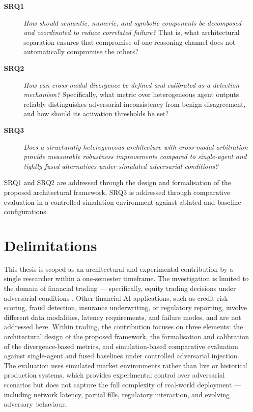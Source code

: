 \begin{description}
  \item[\textbf{SRQ1}] \emph{How should semantic, numeric, and symbolic
    components be decomposed and coordinated to reduce correlated failure?}
    That is, what architectural separation ensures that compromise of one
    reasoning channel does not automatically compromise the others?

  \item[\textbf{SRQ2}] \emph{How can cross-modal divergence be defined and
    calibrated as a detection mechanism?} Specifically, what metric over
    heterogeneous agent outputs reliably distinguishes adversarial
    inconsistency from benign disagreement, and how should its activation
    thresholds be set?

  \item[\textbf{SRQ3}] \emph{Does a structurally heterogeneous architecture
    with cross-modal arbitration provide measurable robustness improvements
    compared to single-agent and tightly fused alternatives under simulated
    adversarial conditions?}
\end{description}

SRQ1 and SRQ2 are addressed through the design and formalisation of the
proposed architectural framework. SRQ3 is addressed through comparative
evaluation in a controlled simulation environment against ablated and
baseline configurations.


\section{Delimitations}
\label{sec:delimitations}
This thesis is scoped as an architectural and experimental contribution by a single researcher within a one-semester timeframe. The investigation is limited to the domain of financial trading — specifically, equity trading decisions under adversarial conditions \cite{10.1145/3490354.3494366}. Other financial AI applications, such as credit risk scoring, fraud detection, insurance underwriting, or regulatory reporting, involve different data modalities, latency requirements, and failure modes, and are not addressed here. Within trading, the contribution focuses on three elements: the architectural design of the proposed framework, the formalisation and calibration of the divergence-based metrics, and simulation-based comparative evaluation against single-agent and fused baselines under controlled adversarial injection. The evaluation uses simulated market environments rather than live or historical production systems, which provides experimental control over adversarial scenarios but does not capture the full complexity of real-world deployment — including network latency, partial fills, regulatory interaction, and evolving adversary behaviour.

